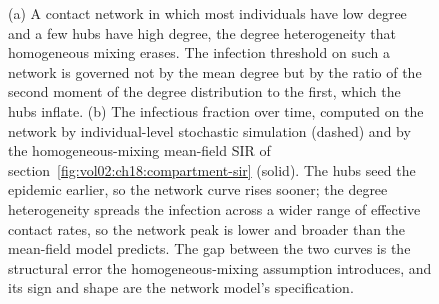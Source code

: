 \begin{figure}[htbp]
\begin{tikzpicture}[font=\small]
\end{tikzpicture}
\caption[A contact network and the contagion it carries]{(a) A contact
network in which most individuals have low degree and a few hubs have
high degree, the degree heterogeneity that homogeneous mixing erases. The
infection threshold on such a network is governed not by the mean degree
but by the ratio of the second moment of the degree distribution to the
first, which the hubs inflate. (b) The infectious fraction over time,
computed on the network by individual-level stochastic simulation
(dashed) and by the homogeneous-mixing mean-field SIR of
section~\ref{fig:vol02:ch18:compartment-sir} (solid). The hubs seed the
epidemic earlier, so the network curve rises sooner; the degree
heterogeneity spreads the infection across a wider range of effective
contact rates, so the network peak is lower and broader than the
mean-field model predicts. The gap between the two curves is the
structural error the homogeneous-mixing assumption introduces, and its
sign and shape are the network model's specification.}
\label{fig:vol02:ch18:network-contagion}
\end{figure}
